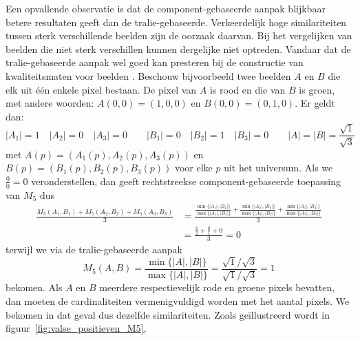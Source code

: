Een opvallende observatie is dat de component-gebaseerde aanpak blijkbaar betere resultaten 
geeft dan de tralie-gebaseerde. Verkeerdelijk hoge similariteiten tussen sterk verschillende 
beelden zijn de oorzaak daarvan. Bij het vergelijken
van beelden die niet sterk verschillen kunnen dergelijke  niet optreden.
Vandaar dat de tralie-gebaseerde aanpak wel goed kan presteren bij de constructie van
kwaliteitsmaten voor beelden \cite{debaets:similariteitsmaten_voor_kleurbeelden}.
Beschouw bijvoorbeeld twee beelden $A$ en $B$ die elk uit \'e\'en enkele pixel bestaan. De pixel 
van $A$ is rood en die van $B$ is groen, met andere woorden: $A(0,0)=(1,0,0)$ en 
$B(0,0)=(0,1,0)$. Er geldt dan: 
\begin{displaymath}
|A_1|=1 \quad |A_2|=0 \quad |A_3|=0 \qquad |B_1|=0 \quad |B_2|=1 \quad |B_3|=0 \qquad |A|=|B|=\frac{\sqrt{1}}{\sqrt{3}}
\end{displaymath}
met $A(p)=(A_1(p),A_2(p),A_3(p))$ en $B(p)=(B_1(p),B_2(p),B_3(p))$ voor elke $p$ uit het universum. Als we
$\frac{0}{0} = 0$ veronderstellen, dan geeft rechtstreekse component-gebaseerde toepassing van 
$M_5$ dus
\begin{align*}
\displaystyle\frac{M_5(A_1,B_1)+M_5(A_2,B_2)+M_5(A_3,B_3)}{3} 
&= \displaystyle\frac{\frac{\min\{|A_1|,|B_1|\}}{\max\{|A_1|,|B_1|\}}+\frac{\min\{|A_2|,|B_2|\}}{\max\{|A_2|,|B_2|\}}+\frac{\min\{|A_3|,|B_3|\}}{\max\{|A_3|,|B_3|\}}}{3} \\
&= \displaystyle\frac{\frac{0}{1}+\frac{0}{1}+0}{3} = 0
\end{align*}
terwijl we via de tralie-gebaseerde aanpak
\begin{displaymath}
M_5(A,B) = \frac{\min\{|A|,|B|\}}{\max\{|A|,|B|\}} = \frac{\scriptstyle \sqrt{1} / \sqrt{3}}{\scriptstyle \sqrt{1} / \sqrt{3}} = 1
\end{displaymath}
bekomen. Als $A$ en $B$ meerdere respectievelijk rode en groene pixels bevatten, dan moeten de cardinaliteiten
vermenigvuldigd worden met het aantal pixels. We bekomen in dat geval dus dezelfde similariteiten. Zoals
ge\"illustreerd wordt in figuur~\ref{fig:valse_positieven_M5}, 
